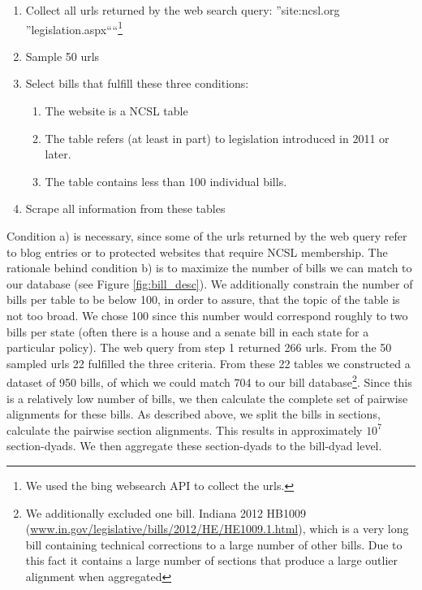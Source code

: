 \documentclass[12pt]{article} %
\begin{document}
\begin{singlespacing}

\begin{enumerate}
    \item Collect all urls returned by the web search query: ''site:ncsl.org ''legislation.aspx````\footnote{We used the bing websearch API to collect the urls.}
    \item Sample 50 urls
    \item Select bills that fulfill these three conditions:
        \begin{enumerate}
            \item The website is a NCSL table
            \item The table refers (at least in part) to legislation introduced in 2011 or later.             \item The table contains less than 100 individual bills. 
        \end{enumerate}
    \item Scrape all information from these tables
\end{enumerate}

\end{singlespacing}

Condition a) is necessary, since some of the urls returned by the web query refer to blog entries or to protected websites that require NCSL membership. The rationale behind condition b) is to maximize the number of bills we can match to our database (see Figure \ref{fig:bill_desc}). We additionally constrain the number of bills per table to be below 100, in order to assure, that the topic of the table is not too broad. We chose 100 since this number would correspond roughly to two bills per state (often there is a house and a senate bill in each state for a particular policy).
The web query from step 1 returned 266 urls. From the 50 sampled urls 22
fulfilled the three criteria. From these 22 tables we constructed a dataset of
950 bills, of which we could match 704 to our bill database\footnote{We
    additionally excluded one bill. Indiana 2012 HB1009
    (\url{www.in.gov/legislative/bills/2012/HE/HE1009.1.html}), which is a
    very long bill containing technical corrections to a large number of
    other bills. Due to this fact it contains a large number of sections that
produce a large outlier alignment when aggregated}. Since this is a
relatively low number of bills, we then calculate the complete set of pairwise
alignments for these bills. As described above, we split the
bills in sections, calculate the pairwise section alignments. This results in
approximately $10^7$ section-dyads. We then aggregate these section-dyads to the
bill-dyad level. 
\end{document}
